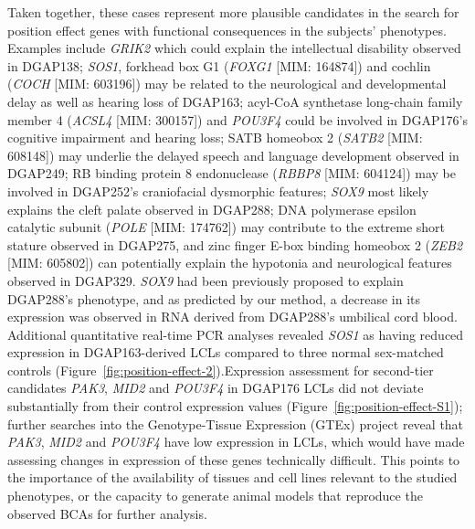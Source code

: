 \documentclass[a4paper,twoside=true,openright,parskip=full,chapterprefix=true,11pt,headings=normal,bibliography=totoc,listof=totoc,titlepage=on,captions=tableabove,draft=false]{scrreprt}
\theoremstyle{definition}
\theoremstyle{definition}
\theoremstyle{definition}
\theoremstyle{remark}
\begin{document}
Taken together, these cases represent more plausible candidates in the
search for position effect genes with functional consequences in the
subjects' phenotypes. Examples include \emph{GRIK2} which could explain
the intellectual disability observed in DGAP138; \emph{SOS1}, forkhead
box G1 (\emph{FOXG1} {[}MIM: 164874{]}) and cochlin (\emph{COCH} {[}MIM:
603196{]}) may be related to the neurological and developmental delay as
well as hearing loss of DGAP163; acyl-CoA synthetase long-chain family
member 4 (\emph{ACSL4} {[}MIM: 300157{]}) and \emph{POU3F4} could be
involved in DGAP176's cognitive impairment and hearing loss; SATB
homeobox 2 (\emph{SATB2} {[}MIM: 608148{]}) may underlie the delayed
speech and language development observed in DGAP249; RB binding protein
8 endonuclease (\emph{RBBP8} {[}MIM: 604124{]}) may be involved in
DGAP252's craniofacial dysmorphic features; \emph{SOX9} most likely
explains the cleft palate observed in DGAP288; DNA polymerase epsilon
catalytic subunit (\emph{POLE} {[}MIM: 174762{]}) may contribute to the
extreme short stature observed in DGAP275, and zinc finger E-box binding
homeobox 2 (\emph{ZEB2} {[}MIM: 605802{]}) can potentially explain the
hypotonia and neurological features observed in DGAP329. \emph{SOX9} had
been previously proposed to explain DGAP288's phenotype, and as
predicted by our method, a decrease in its expression was observed in
RNA derived from DGAP288's umbilical cord blood.\citep{Ordulu2016}
Additional quantitative real-time PCR analyses revealed \emph{SOS1} as
having reduced expression in DGAP163-derived LCLs compared to three
normal sex-matched controls
(Figure~\ref{fig:position-effect-2}).Expression assessment for
second-tier candidates \emph{PAK3}, \emph{MID2} and \emph{POU3F4} in
DGAP176 LCLs did not deviate substantially from their control expression
values (Figure~\ref{fig:position-effect-S1}); further searches into the
Genotype-Tissue Expression (GTEx) project\citep{Lonsdale2013} reveal
that \emph{PAK3}, \emph{MID2} and \emph{POU3F4} have low expression in
LCLs, which would have made assessing changes in expression of these
genes technically difficult. This points to the importance of the
availability of tissues and cell lines relevant to the studied
phenotypes, or the capacity to generate animal models that reproduce the
observed BCAs for further analysis.
\end{document}
